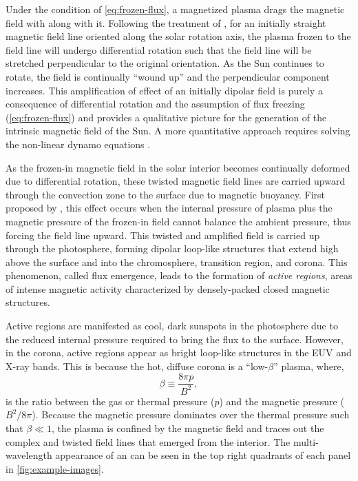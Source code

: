 Under the condition of \autoref{eq:frozen-flux}, a magnetized plasma drags the magnetic field with along with it. Following the treatment of \citet{golub_solar_2010}, for an initially straight magnetic field line oriented along the solar rotation axis, the plasma frozen to the field line will undergo differential rotation such that the field line will be stretched perpendicular to the original orientation. As the Sun continues to rotate, the field is continually ``wound up'' and the perpendicular component increases. This amplification of effect of an initially dipolar field is purely a consequence of differential rotation and the assumption of flux freezing (\autoref{eq:frozen-flux}) and provides a qualitative picture for the generation of the intrinsic magnetic field of the Sun. A more quantitative approach requires solving the non-linear dynamo equations \citep[see Section 4.3.3 of][]{golub_solar_2010}.

As the frozen-in magnetic field in the solar interior becomes continually deformed due to differential rotation, these twisted magnetic field lines are carried upward through the convection zone to the surface due to magnetic buoyancy. First proposed by \citet{parker_formation_1955}, this effect occurs when the internal pressure of plasma plus the magnetic pressure of the frozen-in field cannot balance the ambient pressure, thus forcing the field line upward. This twisted and amplified field is carried up through the photosphere, forming dipolar loop-like structures that extend high above the surface and into the chromosphere, transition region, and corona. This phenomenon, called flux emergence, leads to the formation of \textit{active regions}, areas of intense magnetic activity characterized by densely-packed closed magnetic structures.

Active regions are manifested as cool, dark sunspots in the photosphere due to the reduced internal pressure required to bring the flux to the surface. However, in the corona, active regions appear as bright loop-like structures in the EUV and X-ray bands. This is because the hot, diffuse corona is a ``low-$\beta$'' plasma, where,
\begin{equation}\label{eq:plasma-beta}
    \beta\equiv\frac{8\pi p}{B^2},
\end{equation}
is the ratio between the gas or thermal pressure ($p$) and the magnetic pressure ($B^2/8\pi$). Because the magnetic pressure dominates over the thermal pressure such that $\beta\ll1$, the plasma is confined by the magnetic field and traces out the complex and twisted field lines that emerged from the interior. The multi-wavelength appearance of an \AR{} can be seen in the top right quadrants of each panel in \autoref{fig:example-images}.

